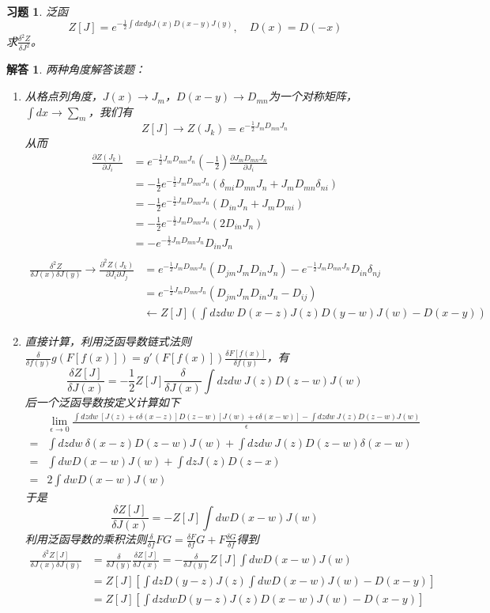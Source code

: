 \documentclass[a4paper,11pt]{ctexart}
\newtheorem{ex}{习题}[section]
\newtheorem{ans}{解答}[section]
\newcommand{\beq}{\begin{equation}}
\newcommand{\eeq}{\end{equation}}
\newcommand{\bea}{\begin{equation}\begin{aligned}}
\newcommand{\eea}{\end{aligned}\end{equation}}
\newcommand{\pfrac}[2]{\frac{\partial #1}{\partial #2}}
\begin{document}
\begin{ex}
泛函
\beq
Z[J] = e^{-\frac{1}{2} \int dx dy J(x) D(x-y) J(y)} ,\quad D(x) = D(-x)
\eeq
求$\frac{\delta^2 Z}{\delta J^2}$。
\end{ex}
\begin{ans}
两种角度解答该题：
\begin{enumerate}
\item  \emph{从格点列角度}，$J(x) \to J_m$，$D(x-y) \to D_{mn}$为一个对称矩阵，$\int dx \to \sum_m$，我们有
\beq
Z[J] \to Z(J_k) = e^{-\frac{1}{2} J_m D_{mn} J_n}
\eeq
从而
\bea
\pfrac{Z(J_k)}{J_i} &= e^{-\frac{1}{2} J_m D_{mn} J_n} \left(-\frac{1}{2}\right) \pfrac{J_m D_{mn} J_n}{J_i} \\
&= -\frac{1}{2} e^{-\frac{1}{2} J_m D_{mn} J_n} \left(\delta_{mi} D_{mn} J_n + J_m D_{mn} \delta_{ni}\right) \\
&= -\frac{1}{2} e^{-\frac{1}{2} J_m D_{mn} J_n} \left( D_{in} J_n + J_m D_{mi} \right) \\
&= -\frac{1}{2} e^{-\frac{1}{2} J_m D_{mn} J_n} (2D_{in} J_n)\\
&= - e^{-\frac{1}{2} J_m D_{mn} J_n} D_{in}J_n\\
\eea
\bea
\frac{\delta^2 Z}{\delta J(x) \delta J(y) }\to \pfrac{^2 Z(J_k)}{J_i \partial J_j} &= e^{-\frac{1}{2} J_m D_{mn} J_n} (D_{jm} J_m D_{in}J_n) - e^{-\frac{1}{2} J_m D_{mn} J_n} D_{in}\delta_{nj} \\
&=e^{-\frac{1}{2} J_m D_{mn} J_n}(D_{jm} J_m D_{in}J_n - D_{ij}) \\
&\leftarrow Z[J] \left(\int dzdw\ D(x-z) J(z) D(y-w) J(w) - D(x-y)\right)
\eea


\item \emph{直接计算}，利用泛函导数链式法则$\frac{\delta }{\delta f(y)} g(F[f(x)])= g'(F[f(x)]) \frac{\delta F[f(x)]}{\delta f(y)}$，有
\beq
\frac{\delta Z[J]}{\delta J(x) } =-\frac{1}{2} Z[J] \frac{\delta}{\delta J(x) }\int dzdw\ J(z) D(z-w) J(w)
\eeq
后一个泛函导数按定义计算如下
\bea
& \lim_{\epsilon \to 0} \frac{\int dzdw\ [J(z) +\epsilon \delta (x-z) ]D(z-w) [J(w) + \epsilon \delta (x-w)] - \int dzdw\ J(z) D(z-w) J(w)}{\epsilon}  \\
= &\int dzdw\  \delta (x-z)D(z-w) J(w) +  \int dzdw\  J(z)D(z-w) \delta(x-w) \\
= &\int dw D(x-w)J(w) + \int dz J(z) D(z-x) \\
= &2\int dw D(x-w)J(w)
\eea
于是
\beq
\frac{\delta Z[J]}{\delta J(x) } =- Z[J]\int dw D(x-w)J(w)
\eeq
利用泛函导数的乘积法则$\frac{\delta}{\delta f} FG = \frac{\delta F}{\delta f}G + F \frac{\delta G}{\delta f}$得到
\bea
\frac{\delta^2 Z[J]}{\delta J(x) \delta J(y)} &= \frac{\delta}{\delta J(y)} \frac{\delta Z[J]}{\delta J(x) } =- \frac{\delta}{\delta J(y)} Z[J]\int dw D(x-w)J(w) \\
&= Z[J] \left[ \int dz D(y-z) J(z) \int dw D(x-w) J(w) - D(x-y)\right]\\
&= Z[J] \left[ \int dzdw D(y-z) J(z) D(x-w) J(w) - D(x-y)\right]\\
\eea
\end{enumerate}
\end{ans}
\end{document}
